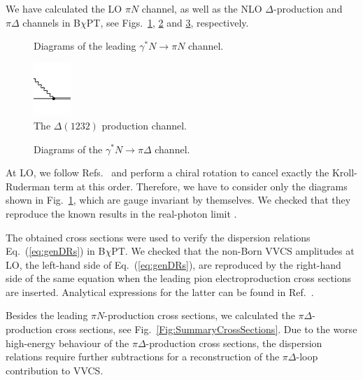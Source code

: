 \documentclass[12pt,preprint,tightenlines,
showpacs,preprintnumbers,amsmath,amssymb,
a4paper,nofootinbib]{revtex4-1}
\def\Eqref#1{Eq.~(\ref{eq:#1})}
\def\ga{\gamma} \def\Ga{{\it\Gamma}}
\begin{document}
We have calculated the LO $\pi N$ channel, as well as the NLO $\Delta$-production and $\pi \Delta$ channels in B$\chi$PT, see Figs.~\ref{Fig:DiagsOp}, \ref{fig:CrossSectionDeltaProd} and \ref{Fig:DiagsDeltaCS}, respectively. 

\begin{figure}[tbh]
\begin{center}
\caption{Diagrams of the leading $\ga^\ast N \to  \pi N$ channel. \label{Fig:DiagsOp}}
\end{center}
\end{figure}

\begin{figure}[tbh]
    \centering 
  \includegraphics[height=2cm]{DeltaExchangeCrossSection.pdf}
\caption{The $\Delta(1232)$ production channel.\label{fig:CrossSectionDeltaProd}}
\end{figure}

\begin{figure}[tbh]
\begin{center}
\caption{Diagrams of the $\ga^\ast N\to \pi\Delta$ channel. \label{Fig:DiagsDeltaCS}}
\end{center}
\end{figure}

At LO, we follow Refs.~\cite{Holstein:2005db,Lensky:2009uv} and perform a chiral rotation to cancel exactly the Kroll-Ruderman term at this order.
Therefore, we have to consider only the diagrams shown in Fig.~\ref{Fig:DiagsOp}, which are gauge invariant by themselves. We  checked that they reproduce the known results in the real-photon limit \cite{Lensky:2009uv,Holstein:2005db}.

The obtained cross sections were used to verify  the dispersion relations \Eqref{genDRs}  in B$\chi$PT. We checked that the non-Born VVCS amplitudes at LO, the left-hand side of \Eqref{genDRs}, are reproduced by the right-hand side of the same equation when the leading pion electroproduction cross sections are inserted. Analytical expressions for the latter can be found in Ref.~\cite{Alarcon:2013cba}. 

Besides the leading $\pi N$-production cross sections, we calculated the $\pi \Delta$-production cross sections, see Fig.~\ref{Fig:SummaryCrossSections}. Due to the worse high-energy behaviour of the $\pi \Delta$-production cross sections, the dispersion relations require further subtractions for a reconstruction of the $\pi \Delta$-loop contribution to VVCS.
\end{document}
